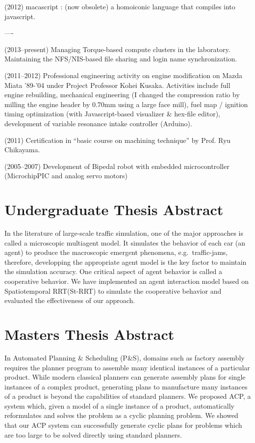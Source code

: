 \documentclass[letterpaper]{article}
\begin{document}
(2012) macascript : (now obsolete) a homoiconic language that compiles
into javascript.

----

(2013--present) Managing Torque-based compute clusters in the laboratory. Maintaining
the NFS/NIS-based file sharing and login name synchronization.

(2011--2012) Professional engineering activity on engine modification on
Mazda Miata '89-'04 under Project Professor Kohei Kusaka. Activities
include full engine rebuilding, mechanical engineering (I changed the
compression ratio by milling the engine header by 0.70mm using a large
face mill), fuel map / ignition timing optimization (with
Javascript-based visualizer \& hex-file editor), development of
variable resonance intake controller (Arduino).

(2011) Certification in ``basic course on machining technique'' by Prof. Ryu Chikayama.

(2005--2007) Development of Bipedal robot with embedded microcontroller
(Microchip\textregistered PIC and analog servo motors)


\section{Undergraduate Thesis Abstract}

{\small
In the literature of large-scale traffic simulation,
one of the major approaches is called a microscopic multiagent model.
It simulates the behavior of each car (an agent)
to produce the macroscopic emergent phenomena, e.g.\  traffic-jams,
therefore, developping the appropriate agent model is the key
factor to maintain the simulation accuracy.  One critical aspect of
agent behavior is called a cooperative behavior. We have implemented an agent
interaction model based on Spatiotemporal RRT(St-RRT) to
simulate the cooperative behavior and evaluated the
effectiveness of our approach.
}

\section{Masters Thesis Abstract}

{\small
In Automated Planning \& Scheduling (P\&S),
domains such as factory assembly requires the planner program to
assemble many identical instances of a particular product.  While modern classical
planners can generate assembly plans for single instances of a complex
product, generating plans to manufacture many instances of a product is
beyond the capabilities of standard planners. We proposed ACP, a system
which, given a model of a single instance of a product, automatically
reformulates and solves the problem as a cyclic planning problem.  We
showed that our ACP system can successfully generate
cyclic plans for problems which are too large to be solved directly
using standard planners.
}
\end{document}
